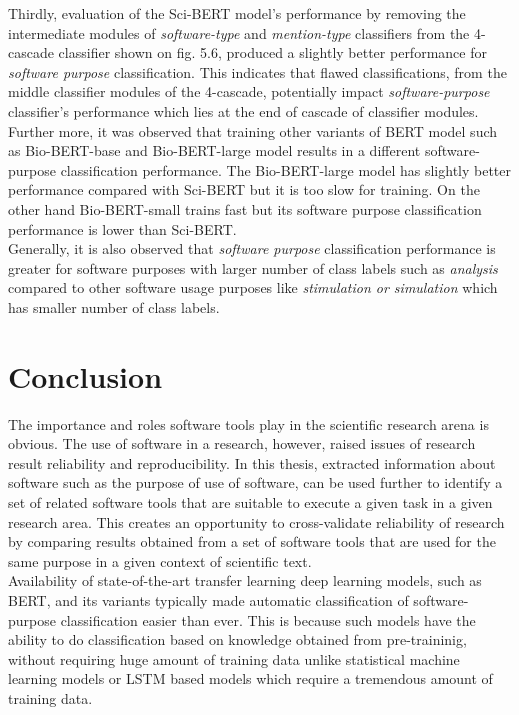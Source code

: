 Thirdly, evaluation of the Sci-BERT model's performance by removing the intermediate modules of \emph{software-type} and \emph{mention-type} classifiers from the 4-cascade classifier shown on fig. 5.6, produced a slightly better performance for \emph{software purpose} classification.  This indicates that flawed classifications, from the middle classifier modules of the 4-cascade, potentially impact \emph{software-purpose} classifier's performance which lies at the end of cascade of classifier modules. \\

Further more, it was observed that training other variants of BERT model such as Bio-BERT-base and Bio-BERT-large model results in a different software-purpose classification performance. The Bio-BERT-large model has slightly better performance compared with Sci-BERT but it is too slow for training. On the other hand Bio-BERT-small trains fast but its software purpose classification performance is lower than Sci-BERT. \\


Generally, it is also observed that \emph{software purpose} classification performance is greater for software purposes with larger number of class labels such as \emph{analysis} compared to other software usage purposes like \emph{stimulation or simulation} which has smaller number of class labels.   


\section{Conclusion}
\label{sec:chapter07:Conclusion}

The importance and roles software tools play in the scientific research arena is obvious. The use of software in a research, however, raised issues of research result reliability and reproducibility. In this thesis, extracted information about software such as the purpose of use of software, can be used further to identify a set of related software tools that are suitable to execute a given task in a given research area. This creates an opportunity to cross-validate reliability of research by comparing results obtained from a set of software tools that are used for the same purpose in a given context of scientific text. \\

Availability of state-of-the-art transfer learning deep learning models, such as BERT, and its variants typically made automatic classification of software-purpose classification easier than ever. This is because such models have the ability to do classification based on knowledge obtained from pre-traininig, without requiring huge amount of training data unlike statistical machine learning models or LSTM based models which require a tremendous amount of training data. 


